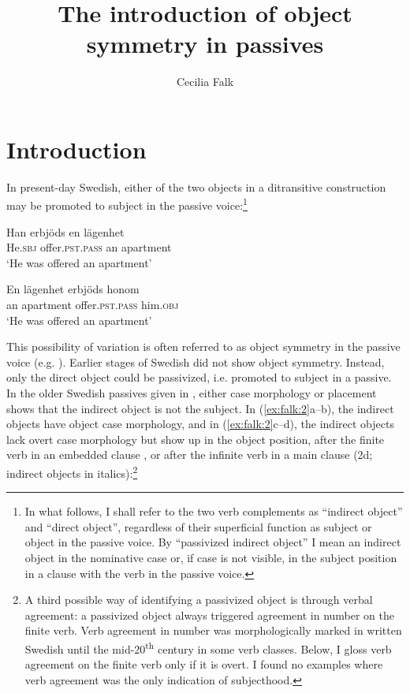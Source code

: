 \documentclass[output=paper]{langscibook}
\author{Cecilia Falk\affiliation{Stockholm University}}
\title{The introduction of object symmetry in passives}
\begin{document}
\maketitle


\section{Introduction}


In present-day Swedish, either of the two objects in a ditransitive construction may be promoted to subject in the passive voice:\footnote{In what follows, I shall refer to the two verb complements as “indirect object” and “direct object”, regardless of their superficial function as subject or object in the passive voice. By “passivized indirect object” I mean an indirect object in the nominative case or, if case is not visible, in the subject position in a clause with the verb in the passive voice.}

\ea%
    \label{ex:falk:1}
\ea
\gll Han    erbjöds      en  lägenhet\\
      He.\textsc{sbj}  offer.\textsc{pst}.\textsc{pass}  an  apartment\\
\glt ‘He was offered an apartment’

\ex
\gll En    lägenhet      erbjöds      honom\\
      an    apartment    offer.\textsc{pst}.\textsc{pass} him.\textsc{obj}\\
\glt ‘He was offered an apartment’
\z
\z


This possibility of variation is often referred to as object symmetry in the passive voice (e.g. \citealt{Anagnostopoulou2003}). Earlier stages of Swedish did not show object symmetry. Instead, only the direct object could be passivized, i.e. promoted to subject in a passive. In the older Swedish passives given in , either case morphology or placement shows that the indirect object is not the subject. In (\ref{ex:falk:2}a–b), the indirect objects have object case morphology, and in (\ref{ex:falk:2}c–d), the indirect objects lack overt case morphology but show up in the object position, after the finite verb in an embedded clause , or after the infinite verb in a main clause (2d; indirect objects in italics):\footnote{A third possible way of identifying a passivized object is through verbal agreement: a passivized object always triggered agreement in number on the finite verb. Verb agreement in number was morphologically marked in written Swedish until the mid-20\textsuperscript{th} century in some verb classes. Below, I gloss verb agreement on the finite verb only if it is overt. I found no examples where verb agreement was the only indication of subjecthood.}
\end{document}
